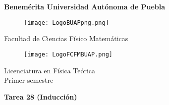 \documentclass[12pt]{article}
\begin{document}
\begingroup
\begin{titlepage}
	\noindent
	\vspace{1mm}
\end{titlepage}
\endgroup

\pagestyle{empty} 
\setlength{\parindent}{0pt}
\sffamily


\begin{center} 

    \LARGE{\bf{\textsf{Benemérita Universidad Autónoma de Puebla}}} \\[0.5cm]
    
\begin{figure}[htb] \centering

    \texttt{[image: LogoBUAPpng.png]} 

\end{figure}


    \LARGE{Facultad de Ciencias Físico Matemáticas}\\[0.5cm]

\begin{figure}[htb] \centering

    \texttt{[image: LogoFCFMBUAP.png]} 
    
\end{figure} 


    \Large{Licenciatura en Física Teórica}\\[0.5cm]
    \Large{Primer semestre} 

\end{center} \vspace{0.3cm}

\begin{center}

    {\Large{\bfseries{{\textcolor{carrotorange}{Tarea 28 (Inducción)}}}}} \\ 
    
\end{center}
\end{document}
